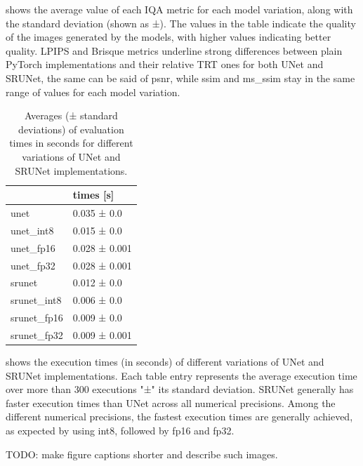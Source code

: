  shows the average value of each IQA metric for each model variation, along with the standard deviation (shown as ±). The values in the table indicate the quality of the images generated by the models, with higher values indicating better quality.
LPIPS and Brisque metrics underline strong differences between plain PyTorch implementations and their relative TRT ones for both UNet and SRUNet, the same can be said of psnr, while ssim and ms\_ssim stay in the same range of values for each model variation.

\begin{table}[t]
\begin{tabular}{ll}
\toprule
{} &      times [s] \\
\midrule
unet        &    0.035 ± 0.0 \\
unet\_int8   &    0.015 ± 0.0 \\
unet\_fp16   &  0.028 ± 0.001 \\
unet\_fp32   &  0.028 ± 0.001 \\
srunet      &    0.012 ± 0.0 \\
srunet\_int8 &    0.006 ± 0.0 \\
srunet\_fp16 &    0.009 ± 0.0 \\
srunet\_fp32 &  0.009 ± 0.001 \\
\bottomrule
\end{tabular}
\caption{Averages (± standard deviations) of evaluation times in seconds for different variations of UNet and SRUNet implementations.}
\label{tab:tab2}
\end{table}

 shows the execution times (in seconds) of different variations of UNet and SRUNet implementations. Each table entry represents the average execution time over more than 300 executions "±" its standard deviation. SRUNet generally has faster execution times than UNet across all numerical precisions. Among the different numerical precisions, the fastest execution times are generally achieved, as expected by using int8, followed by fp16 and fp32.

TODO: make figure captions shorter and describe such images.

